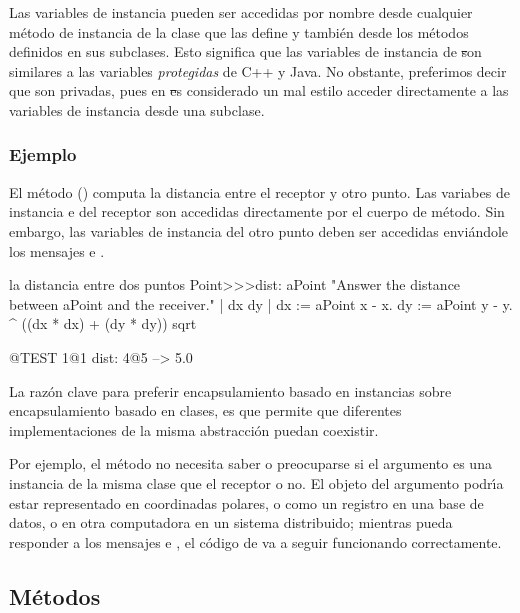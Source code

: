 \documentclass[a4paper,10pt,twoside]{book}
\begin{document}
Las variables de instancia pueden ser accedidas por nombre desde cualquier m\'etodo de instancia de la clase que las define y tambi\'en desde los m\'etodos definidos en sus subclases. Esto significa que las variables de instancia de \st son similares a las variables  \emph{protegidas} de C++ y Java.      
No obstante, preferimos decir que son privadas, pues en \st es considerado un mal estilo acceder directamente a las variables de instancia desde una subclase.  

\subsubsection{Ejemplo}

El m\'etodo  () computa la distancia entre el receptor y otro punto. Las variabes de instancia  e  del receptor son accedidas directamente por el cuerpo de m\'etodo. Sin embargo, las variables de instancia del otro punto deben ser accedidas envi\'andole los mensajes  e .


\begin{method}[dist:]{la distancia entre dos puntos}
Point>>>dist: aPoint 
	"Answer the distance between aPoint and the receiver."  
	| dx dy |
	dx := aPoint x - x.
	dy :=  aPoint y - y.
	^ ((dx * dx) + (dy * dy)) sqrt
\end{method}

\begin{code}{@TEST}
1@1 dist: 4@5 --> 5.0
\end{code}

La raz\'on clave para preferir encapsulamiento basado en instancias sobre encapsulamiento basado en clases, es que permite que diferentes implementaciones de la misma abstracci\'on puedan coexistir. 

Por ejemplo, el m\'etodo  no necesita saber o preocuparse si el argumento  es una instancia de la misma clase que el receptor o no. El objeto del argumento podr\'\i{}a estar representado en coordinadas polares, o como un registro en una base de datos, o en otra computadora en un sistema distribuido; mientras pueda responder a los mensajes  e , el c\'odigo de  va a seguir funcionando correctamente.

\subsection{M\'etodos}
\end{document}
